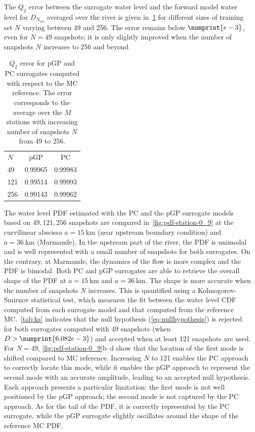 
The $Q_2$ error between the surrogate water level and the forward model water level for $D_{N_{\text{ref}}}$ averaged over the river is given in~\cref{tab:valid_model} for different  sizes of training set $N$ varying between 49 and 256. The error remains below $\numprint{e-3}$, even for $N = 49$ snapshots; it is only slightly improved when the number of snapshots $N$ increases to 256 and beyond. 
\begin{table}[ht]
\centering
\caption{$Q_2$ error for pGP and PC surrogates computed with respect to the MC reference. The error corresponds to the average over the $M$ stations with increasing number of snapshots $N$ from 49 to 256.}
\begin{tabular}{lcc}
\toprule
$N$ & pGP & PC \\
\cmidrule{2-3}
49  & 0.99965 & 0.99983\\
121 & 0.99514 & 0.99993\\
256 & 0.99143 & 0.99962\\
\bottomrule
\end{tabular}
\label{tab:valid_model}
\end{table}

The water level PDF estimated with the PC and the pGP surrogate models based on $49, 121, 256$ snapshots are compared in~\cref{fig:pdf-station-0_9} at the curvilinear abscissa $a = 15~\text{km}$ (near upstream boundary condition) and $a = 36~\text{km}$ (Marmande). In the upstream part of the river, the PDF is unimodal and is well represented with a small number of snapshots for both surrogates. On the contrary, at Marmande, the dynamics of the flow is more complex and the PDF is bimodal. Both PC and pGP surrogates are able to retrieve the overall shape of the PDF at $a = 15~\text{km}$ and $a = 36~\text{km}$. The shape is more accurate when the number of snapshots $N$ increases. This is quantified using a Kolmogorov-Smirnov statistical test, which measures the fit between the water level CDF computed from each surrogate model and that computed from the reference MC.~\cref{tab:ks} indicates that the null hypothesis (\cref{eq:nullhypothesis}) is rejected for both surrogates computed with 49 snapshots (when $D > \numprint{6.082e-3}$) and accepted when at least 121 snapshots are used. For $N = 49$, \cref{fig:pdf-station-0_9}b--d show that the location of the first mode is shifted compared to MC reference. Increasing $N$ to 121 enables the PC approach to correctly locate this mode, while it enables the pGP approach to represent the second mode with an accurate amplitude, leading to an accepted null hypothesis. Each approach presents a particular limitation: the first mode is not well positioned by the pGP approach; the second mode is not captured by the PC approach. As for the tail of the PDF, it is correctly represented by the PC surrogate, while the pGP surrogate slightly oscillates around the shape of the reference MC PDF.

